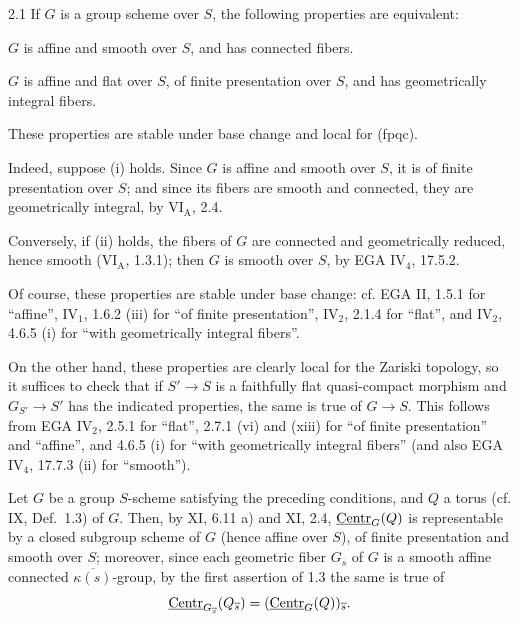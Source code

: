 \label{XIX.sec.2}
\begin{scholium}{2.1}\label{XIX.2.1}
If $G$ is a group scheme over $S$, the following properties are equivalent:
\begin{enumeratei}
\item $G$ is affine and smooth over $S$, and has connected fibers.
\item $G$ is affine and flat over $S$, of finite presentation over $S$, and has geometrically integral fibers.
\end{enumeratei}
These properties are stable under base change and local for (fpqc).
\end{scholium}
{\renewcommand{\thefootnote}{(15)}}%
Indeed, suppose (i) holds. Since $G$ is affine and smooth over $S$, it is of finite presentation over $S$; and since its fibers are smooth and connected, they are geometrically integral, by VI$_{\mathrm A}$, 2.4.

Conversely, if (ii) holds, the fibers of $G$ are connected and geometrically reduced, hence smooth (VI$_{\mathrm A}$, 1.3.1); then $G$ is smooth over $S$, by EGA IV$_4$, 17.5.2.

Of course, these properties are stable under base change: cf. EGA II, 1.5.1 for ``affine'', IV$_1$, 1.6.2 (iii) for ``of finite presentation'', IV$_2$, 2.1.4 for ``flat'', and IV$_2$, 4.6.5 (i) for ``with geometrically integral fibers''.

On the other hand, these properties are clearly local for the Zariski topology, so it suffices to check that if $S'\to S$ is a faithfully flat quasi-compact morphism and $G_{S'}\to S'$ has the indicated properties, the same is true of $G\to S$. This follows from EGA IV$_2$, 2.5.1 for ``flat'', 2.7.1 (vi) and (xiii) for ``of finite presentation'' and ``affine'', and 4.6.5 (i) for ``with geometrically integral fibers'' (and also EGA IV$_4$, 17.7.3 (ii) for ``smooth'').

 Let $G$ be a group $S$-scheme satisfying the preceding conditions, and $Q$ a torus (cf. IX, Def.~1.3) of $G$.{\renewcommand{\thefootnote}{(16)}} Then, by XI, 6.11 a) and XI, 2.4, $\underline{\mathrm{Centr}}_G(Q)$ is representable by a closed subgroup scheme of $G$ (hence affine over $S$), of finite presentation and smooth over $S$; moreover, since each geometric fiber $G_{\overline{s}}$ of $G$ is a smooth affine connected $\overline{\kappa(s)}$-group, by the first assertion of 1.3 the same is true of
\[
\underline{\mathrm{Centr}}_{G_{\overline{s}}}(Q_{\overline{s}})=(\underline{\mathrm{Centr}}_G(Q))_{\overline{s}}.
\]

